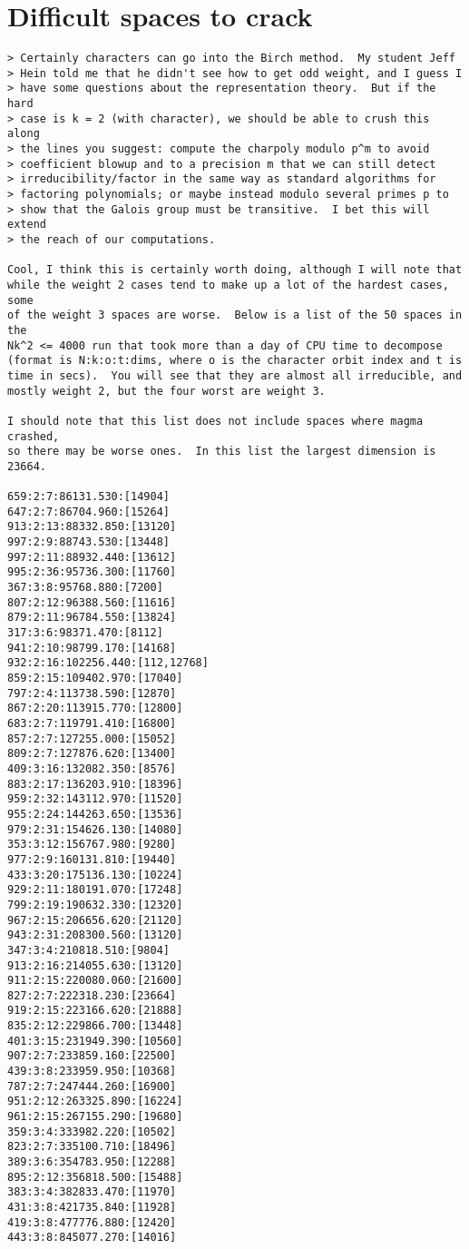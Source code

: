 \documentclass[11pt]{amsart}
\numberwithin{equation}{subsection}
\theoremstyle{definition}
\begin{document}
\section{Difficult spaces to crack}

\begin{verbatim}
> Certainly characters can go into the Birch method.  My student Jeff
> Hein told me that he didn't see how to get odd weight, and I guess I
> have some questions about the representation theory.  But if the hard
> case is k = 2 (with character), we should be able to crush this along
> the lines you suggest: compute the charpoly modulo p^m to avoid
> coefficient blowup and to a precision m that we can still detect
> irreducibility/factor in the same way as standard algorithms for
> factoring polynomials; or maybe instead modulo several primes p to
> show that the Galois group must be transitive.  I bet this will extend
> the reach of our computations.

Cool, I think this is certainly worth doing, although I will note that
while the weight 2 cases tend to make up a lot of the hardest cases, 
some
of the weight 3 spaces are worse.  Below is a list of the 50 spaces in 
the
Nk^2 <= 4000 run that took more than a day of CPU time to decompose
(format is N:k:o:t:dims, where o is the character orbit index and t is
time in secs).  You will see that they are almost all irreducible, and
mostly weight 2, but the four worst are weight 3.

I should note that this list does not include spaces where magma 
crashed,
so there may be worse ones.  In this list the largest dimension is 
23664.

659:2:7:86131.530:[14904]
647:2:7:86704.960:[15264]
913:2:13:88332.850:[13120]
997:2:9:88743.530:[13448]
997:2:11:88932.440:[13612]
995:2:36:95736.300:[11760]
367:3:8:95768.880:[7200]
807:2:12:96388.560:[11616]
879:2:11:96784.550:[13824]
317:3:6:98371.470:[8112]
941:2:10:98799.170:[14168]
932:2:16:102256.440:[112,12768]
859:2:15:109402.970:[17040]
797:2:4:113738.590:[12870]
867:2:20:113915.770:[12800]
683:2:7:119791.410:[16800]
857:2:7:127255.000:[15052]
809:2:7:127876.620:[13400]
409:3:16:132082.350:[8576]
883:2:17:136203.910:[18396]
959:2:32:143112.970:[11520]
955:2:24:144263.650:[13536]
979:2:31:154626.130:[14080]
353:3:12:156767.980:[9280]
977:2:9:160131.810:[19440]
433:3:20:175136.130:[10224]
929:2:11:180191.070:[17248]
799:2:19:190632.330:[12320]
967:2:15:206656.620:[21120]
943:2:31:208300.560:[13120]
347:3:4:210818.510:[9804]
913:2:16:214055.630:[13120]
911:2:15:220080.060:[21600]
827:2:7:222318.230:[23664]
919:2:15:223166.620:[21888]
835:2:12:229866.700:[13448]
401:3:15:231949.390:[10560]
907:2:7:233859.160:[22500]
439:3:8:233959.950:[10368]
787:2:7:247444.260:[16900]
951:2:12:263325.890:[16224]
961:2:15:267155.290:[19680]
359:3:4:333982.220:[10502]
823:2:7:335100.710:[18496]
389:3:6:354783.950:[12288]
895:2:12:356818.500:[15488]
383:3:4:382833.470:[11970]
431:3:8:421735.840:[11928]
419:3:8:477776.880:[12420]
443:3:8:845077.270:[14016]
\end{verbatim}
\end{document}
